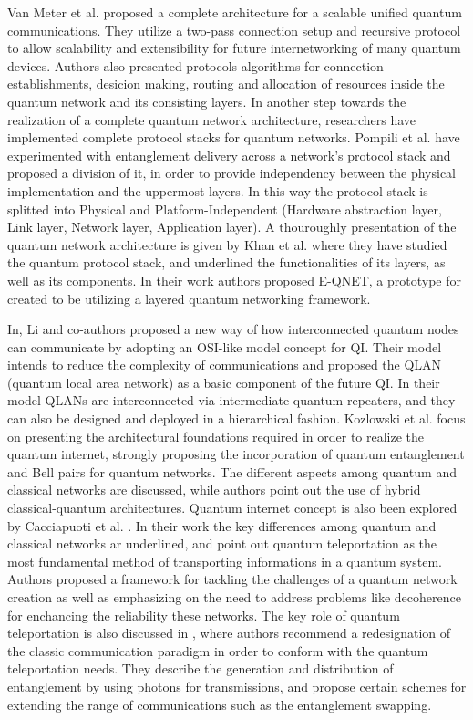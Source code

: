 		Van Meter et al. \cite{quantum-arch} proposed a complete architecture 
		for a scalable unified quantum communications. They utilize a two-pass connection setup and recursive protocol
		to allow scalability and extensibility for future internetworking
		of many quantum devices. Authors also presented protocols-algorithms for connection establishments, desicion making, routing and 
		allocation of resources inside the quantum network and its consisting layers.
		In another step towards the realization of a complete quantum network architecture,
		researchers have implemented complete protocol stacks for quantum networks.
		Pompili et al. \cite{pompilli} have experimented with entanglement delivery across 
		a network's protocol stack and proposed a division of it, in order to provide 
		independency between the physical implementation and the uppermost layers. 
		In this way the protocol stack is splitted into Physical and Platform-Independent
		(Hardware abstraction layer, Link layer, Network layer, Application layer).
		A thouroughly presentation of the quantum network architecture is given by Khan et al. \cite{e-qnet}
		where they have studied the quantum protocol stack, and underlined the functionalities of its layers, as well 
		as its components. In their work authors proposed E-QNET, a prototype for  created to be utilizing a layered quantum networking
		framework.

		In\cite{li-arch}, Li and co-authors proposed a new way of how interconnected
		quantum nodes can communicate by adopting an OSI-like
		model concept for QI. Their model intends to reduce the complexity of communications
		and proposed the QLAN (quantum local area network) as a basic component of the future QI. In their model
		QLANs are interconnected via intermediate quantum repeaters, and they can also be designed and deployed in
		a hierarchical fashion.
		Kozlowski et al. \cite{rfc} focus on presenting the architectural foundations required in order to
		realize the quantum internet, strongly proposing the incorporation of quantum entanglement and Bell pairs for quantum networks. 
		The different aspects among quantum and classical networks are discussed, while authors point out the use of hybrid
		classical-quantum architectures. Quantum internet concept is also been explored by Cacciapuoti et al. \cite{net-chall-dqc}.
		In their work the key differences among quantum and classical
		networks ar underlined, and point out quantum teleportation as the most fundamental method of transporting 
		informations in a quantum system. Authors proposed a framework for tackling the challenges of a quantum
		network creation as well as emphasizing on the need to address problems like decoherence for enchancing the
		reliability these networks. The key role of quantum teleportation is also discussed in \cite{entagl-classic},
		where authors recommend a redesignation of the classic communication paradigm in order to conform with the quantum teleportation needs.
		They describe the generation and distribution of entanglement by using photons for transmissions, and propose certain schemes for extending
		the range of communications such as the entanglement swapping.
		
